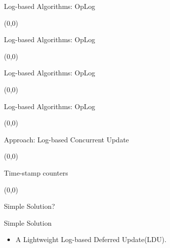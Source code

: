 \documentclass[english]{beamer} %
\begin{document}
\begin{frame}{Log-based Algorithms: OpLog}
\begin{textblock}{1}(0,0)
\end{textblock}
\end{frame}


\begin{frame}{Log-based Algorithms: OpLog}
\begin{textblock}{1}(0,0)
\end{textblock}
\end{frame}


\begin{frame}{Log-based Algorithms: OpLog}
\begin{textblock}{1}(0,0)
\end{textblock}
\end{frame}

\begin{frame}{Log-based Algorithms: OpLog}
\begin{textblock}{1}(0,0)
\end{textblock}
\end{frame}



\begin{frame}{Approach: Log-based Concurrent Update}
\begin{textblock}{1}(0,0)
\end{textblock}
\end{frame}


\begin{frame}{Time-stamp counters}
\begin{textblock}{1}(0,0)
\end{textblock}
\end{frame}

\begin{frame}{Simple Solution?}
\end{frame}

\begin{frame}{Simple Solution}
    \begin{itemize}[<+-| alert@+>]
    \item A Lightweight Log-based Deferred Update(LDU).
    \end{itemize}
\end{frame}
\end{document}
